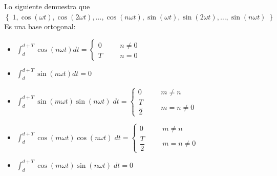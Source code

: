 \documentclass[12pt, fleqn]{report}                             %
\DeclareMathOperator \Space     {\quad}                         %
\theoremstyle{break}                                            %
\newcommand{\Set}[1]            {\left\{ \; #1 \; \right\}}     %
\newcommand{\Wrap}[1]           {\left( #1 \right)}             %
\newcommand{\Cos}[1] {\cos\Wrap{#1}}                            %
\newcommand{\Sin}[1] {\sin\Wrap{#1}}                            %
\begin{document}
            Lo siguiente demuestra que $\Set{1, \Cos{\omega t}, \Cos{2 \omega t}, \dots,
            \Cos{n \omega t}, \Sin{\omega t}, \Sin{2 \omega t}, \dots, \Sin{n \omega t}}$
            Es una base ortogonal:
            \begin{itemize}
                \item
                    ${\displaystyle
                    \int_d^{d+T} \Cos{n \omega t} dt = 
                    \begin{cases}
                        0 &\Space n \neq 0  \\
                        T &\Space n = 0
                    \end{cases}
                    }$

                \item
                    ${\displaystyle
                    \int_d^{d+T} \Sin{n \omega t} dt = 0
                    }$

                \item
                    ${\displaystyle
                    \int_d^{d+T} \Sin{m \omega t} \Sin{n \omega t} \; dt =
                    \begin{cases}
                        0               &\Space m \neq n  \\
                        \dfrac{T}{2}    &\Space m = n \neq 0
                    \end{cases}
                    }$

                \item
                    ${\displaystyle
                    \int_d^{d+T} \Cos{m \omega t} \Cos{n \omega t} \; dt =
                    \begin{cases}
                        0               &\Space m \neq n  \\
                        \dfrac{T}{2}    &\Space m = n \neq 0
                    \end{cases}
                    }$

                \item
                    ${\displaystyle
                    \int_d^{d+T} \Cos{m \omega t} \Sin{n \omega t} \; dt =
                    0
                    }$
            \end{itemize}


                      

        \clearpage
\end{document}
